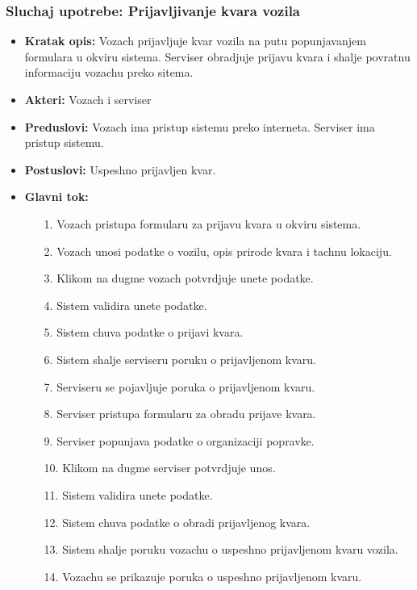 \subsubsection{Sluchaj upotrebe: Prijavljivanje kvara vozila}
\begin{itemize}
\item{\textbf{Kratak opis:} Vozach prijavljuje kvar vozila na putu popunjavanjem formulara u okviru sistema. Serviser obradjuje prijavu kvara i shalje povratnu informaciju vozachu preko sitema.}
\item{\textbf{Akteri:} Vozach i serviser}

\item{\textbf{Preduslovi:} Vozach ima pristup sistemu preko interneta. Serviser ima pristup sistemu. }
\item{\textbf{Postuslovi:} Uspeshno prijavljen kvar.}
\item{\textbf{Glavni tok:} 
\begin{enumerate}
    \item [1.] Vozach pristupa formularu za prijavu kvara u okviru sistema.
    \item[2.] Vozach unosi podatke o vozilu, opis prirode kvara i tachnu lokaciju.
    \item[3.] Klikom na dugme vozach potvrdjuje unete podatke.
    \item[4.] Sistem validira unete podatke.
    \item[5.] Sistem chuva podatke o prijavi kvara.
    \item[6.] Sistem shalje serviseru poruku o prijavljenom kvaru.
    \item[7.] Serviseru se pojavljuje poruka o prijavljenom kvaru.
    \item[8.] Serviser pristupa formularu za obradu prijave kvara.
    \item[9.] Serviser popunjava podatke o organizaciji popravke.
    \item[10.] Klikom na dugme serviser potvrdjuje unos.
    \item[11.] Sistem validira unete podatke.
    \item [12.] Sistem chuva podatke o obradi prijavljenog kvara.
    \item[13.] Sistem shalje poruku vozachu o uspeshno prijavljenom kvaru vozila. 
    \item[14.] Vozachu se prikazuje poruka o uspeshno prijavljenom kvaru.
    
\end{enumerate}

}
\end{itemize}
